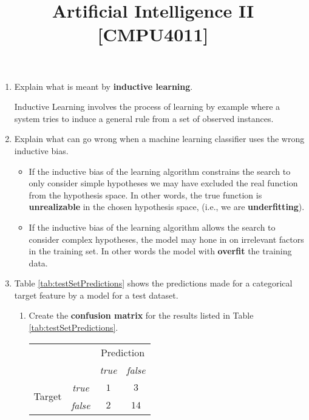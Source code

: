 \documentclass[nosolution]{ditpaper}
\title{Artificial Intelligence II [CMPU4011]}
\begin{document}

\question
\begin{enumerate}
	\item Explain what is meant by \textbf{inductive learning}.
	\begin{answer}
		Inductive Learning involves the process of learning by example where a system tries to induce a general rule from a set of observed instances.
	\end{answer}
	\item Explain what can go wrong when a machine learning classifier uses the wrong inductive bias.
\begin{answer}
			\begin{itemize}
				\item If the inductive bias of the learning algorithm constrains the search to only consider simple hypotheses we may have excluded the real function from the hypothesis space. In other words, the true function is \textbf{unrealizable} in the chosen hypothesis space, (i.e., we are \textbf{underfitting}). 
				\item If the inductive bias of the learning algorithm allows the search to consider complex hypotheses, the model may hone in on irrelevant factors in the training set. In other words the model with \textbf{overfit} the training data.
			\end{itemize}
\end{answer}

	\item Table \ref{tab:testSetPredictions} shows the predictions made for a categorical target feature by a model for a test dataset. 
\begin{enumerate} 
\item Create the \textbf{confusion matrix} for the results listed in Table \ref{tab:testSetPredictions}.
\begin{answer}
\begin{tabular}{c c c  c }
   ~ & ~ &  \multicolumn{2}{c}{Prediction} \\
  ~ & ~ &  \textit{true} &  \textit{false} \\
  \hline
  \multirow{2}{*}{\parbox{1.1cm}{\raggedleft Target}}  & \textit{true} & $1$	&	$3$ \\
  & \textit{false} & $2$	&	$14$ 
\end{tabular}
\end{answer}


\end{enumerate}
\end{enumerate}
\end{document}
